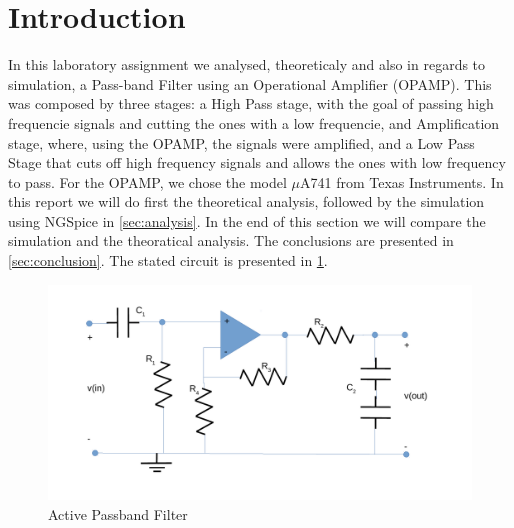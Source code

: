 \section{Introduction}
\label{sec:introduction}

In this laboratory assignment we analysed, theoreticaly and also in regards to simulation, a Pass-band Filter using an Operational Amplifier (OPAMP).
This was composed by three stages: a High Pass stage, with the goal of passing high frequencie signals and cutting the ones with a low frequencie, and Amplification stage, where, using the OPAMP, the signals were amplified, and a Low Pass Stage that cuts off high frequency signals and allows the ones with low frequency to pass. For the OPAMP, we chose the model $\mu$A741 from Texas Instruments. In this report we will do first the theoretical analysis, followed by the simulation using NGSpice in \ref{sec:analysis}. In the end of this section we will compare the simulation and the theoratical analysis. The conclusions are presented in \ref{sec:conclusion}.
The stated circuit is presented in \ref{fig:circuitol5}.


\begin{figure}[h] \centering
\includegraphics[width=1\linewidth]{circuitl5_old.pdf}
\caption{Active Passband Filter}
\label{fig:circuitol5}
\end{figure}

\clearpage
